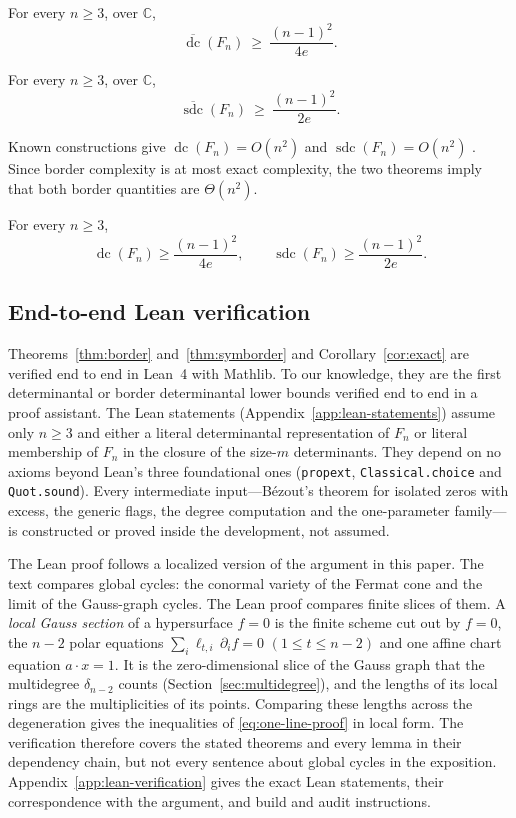 \documentclass[acmsmall,screen,nonacm]{acmart}
\theoremstyle{definition}
\theoremstyle{remark}
\DeclareMathOperator{\dc}{dc}
\DeclareMathOperator{\sdc}{sdc}
\newcommand{\CC}{\mathbb{C}}
\newcommand{\pdeg}{\delta}
\newcommand{\dcb}{\overline{\dc}}
\newcommand{\sdcb}{\overline{\sdc}}
\begin{document}
\begin{theorem}\label{thm:border}
For every $n\ge3$, over $\CC$,
\[
  \dcb(F_n)\ \ge\ \frac{(n-1)^2}{4e}.
\]
\end{theorem}

\begin{theorem}\label{thm:symborder}
For every $n\ge3$, over $\CC$,
\[
  \sdcb(F_n)\ \ge\ \frac{(n-1)^2}{2e}.
\]
\end{theorem}

Known constructions give $\dc(F_n)=O(n^2)$ and $\sdc(F_n)=O(n^2)$ \cite{KumarVolk21,SheshadriSDC}.  Since border complexity is at most exact complexity, the two theorems imply that both border quantities are $\Theta(n^2)$.

\begin{corollary}\label{cor:exact}
For every $n\ge3$,
\[
  \dc(F_n)\ge\frac{(n-1)^2}{4e},
  \qquad
  \sdc(F_n)\ge\frac{(n-1)^2}{2e}.
\]
\end{corollary}

\subsection{End-to-end Lean verification}\label{sec:lean-overview}
Theorems~\ref{thm:border} and~\ref{thm:symborder} and Corollary~\ref{cor:exact} are verified end to end in Lean~4 with Mathlib.  To our knowledge, they are the first determinantal or border determinantal lower bounds verified end to end in a proof assistant.  The Lean statements (Appendix~\ref{app:lean-statements}) assume only $n\ge3$ and either a literal determinantal representation of $F_n$ or literal membership of $F_n$ in the closure of the size-$m$ determinants.  They depend on no axioms beyond Lean's three foundational ones (\texttt{propext}, \texttt{Classical.choice} and \texttt{Quot.sound}).  Every intermediate input---B\'ezout's theorem for isolated zeros with excess, the generic flags, the degree computation and the one-parameter family---is constructed or proved inside the development, not assumed.

The Lean proof follows a localized version of the argument in this paper.  The text compares global cycles: the conormal variety of the Fermat cone and the limit of the Gauss-graph cycles.  The Lean proof compares finite slices of them.  A \emph{local Gauss section} of a hypersurface $f=0$ is the finite scheme cut out by $f=0$, the $n-2$ polar equations $\sum_i\ell_{t,i}\,\partial_if=0$ $(1\le t\le n-2)$ and one affine chart equation $a\cdot x=1$.  It is the zero-dimensional slice of the Gauss graph that the multidegree $\pdeg_{n-2}$ counts (Section~\ref{sec:multidegree}), and the lengths of its local rings are the multiplicities of its points.  Comparing these lengths across the degeneration gives the inequalities of \eqref{eq:one-line-proof} in local form.  The verification therefore covers the stated theorems and every lemma in their dependency chain, but not every sentence about global cycles in the exposition.  Appendix~\ref{app:lean-verification} gives the exact Lean statements, their correspondence with the argument, and build and audit instructions.
\end{document}
